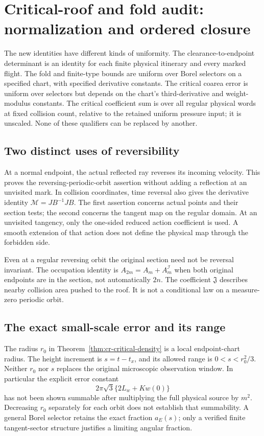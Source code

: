 \section{Critical-roof and fold audit: normalization and ordered closure}
\label{sec:cr-audit}
The new identities have different kinds of uniformity. The
clearance-to-endpoint determinant is an identity for each finite
physical itinerary and every marked flight. The fold and finite-type
bounds are uniform over Borel selectors on a specified chart, with
specified derivative constants. The critical coarea error is uniform
over selectors but depends on the chart's third-derivative and
weight-modulus constants. The critical coefficient sum is over all
regular physical words at fixed collision count, relative to the
retained uniform pressure input; it is unscaled. None of these
qualifiers can be replaced by another.

\subsection{Two distinct uses of reversibility}
At a normal endpoint, the actual reflected ray reverses its incoming
velocity. This proves the reversing-periodic-orbit assertion without
adding a reflection at an unvisited mark. In collision coordinates,
time reversal also gives the derivative identity
$\mathcal M=JB^{-1}JB$. The first assertion concerns actual points
and their section tests; the second concerns the tangent map on the
regular domain. At an unvisited tangency, only the one-sided reduced
action coefficient is used. A smooth extension of that action does
not define the physical map through the forbidden side.

Even at a regular reversing orbit the original section need not be
reversal invariant. The occupation identity is
$A_{2m}=A_m+A_m^{\mathcal I}$ when both original endpoints are in
the section, not automatically $2n$. The coefficient
$\mathfrak J$ describes nearby collision area pushed to the roof.
It is not a conditional law on a measure-zero periodic orbit.

\subsection{The exact small-scale error and its range}
The radius $r_0$ in Theorem~\ref{thm:cr-critical-density} is a local
endpoint-chart radius. The height increment is $s=t-t_x$, and its
allowed range is $0<s<r_0^2/3$. Neither $r_0$ nor $s$ replaces the
original microscopic observation window. In particular the explicit
error constant
\[
 2\pi\sqrt3\{2L_w+Kw(0)\}
\]
has not been shown summable after multiplying the full physical
source by $m^2$. Decreasing $r_0$ separately for each orbit does not
establish that summability. A general Borel selector retains the
exact fraction $a_E(s)$; only a verified finite tangent-sector
structure justifies a limiting angular fraction.

